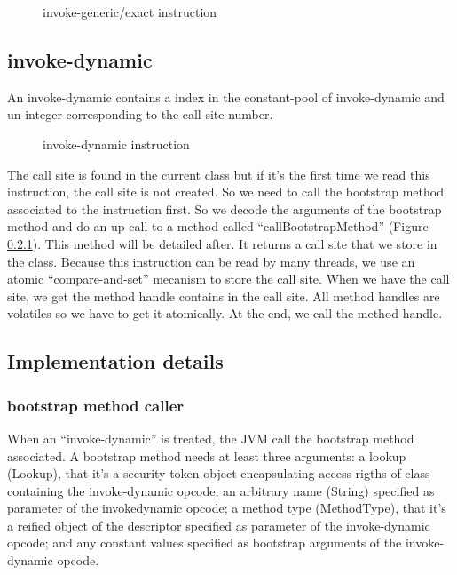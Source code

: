 \documentclass{sig-alternate}
\def \JVM{JVM\xspace}
\begin{document}
    \begin{figure}[!h]
      \centering 
      \caption{invoke-generic/exact instruction}
      \label{INGEins}
    \end{figure}

  \subsection{invoke-dynamic}

    An invoke-dynamic contains a index in the constant-pool of invoke-dynamic and un integer corresponding to the call site number.

    \begin{figure}[!h]
      \centering 
      \caption{invoke-dynamic instruction}
      \label{INDYins}
    \end{figure}

    The call site is found in the current class but if it's the first time we read this instruction, the call site is not created.
    So we need to call the bootstrap method associated to the instruction first.
    So we decode the arguments of the bootstrap method and do an up call to a method called ``callBootstrapMethod'' (Figure \ref{bsm}).
    This method will be detailed after.
    It returns a call site that we store in the class.
    Because this instruction can be read by many threads, we use an atomic ``compare-and-set'' mecanism to store the call site.
    When we have the call site, we get the method handle contains in the call site.
    All method handles are volatiles so we have to get it atomically.
    At the end, we call the method handle.

    \subsection{Implementation details}

      \subsubsection{bootstrap method caller}
        \label{bsm}

        When an ``invoke-dynamic'' is treated, the \JVM call the bootstrap method associated.%
        A bootstrap method needs at least three arguments:
        a lookup (Lookup), that it's a security token object encapsulating access rigths of class containing the invoke-dynamic opcode;
        an arbitrary name (String) specified as parameter of the invokedynamic opcode;
        a method type (MethodType), that it's a reified object of the descriptor specified as parameter of the invoke-dynamic opcode;
        and any constant values specified as bootstrap arguments of the invoke-dynamic opcode.
\end{document}
